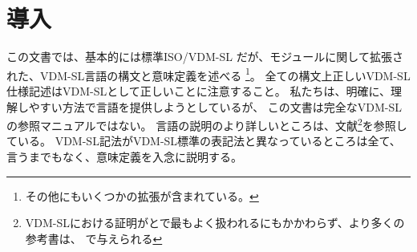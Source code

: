 \documentclass[\pformat,12pt]{jarticle}
\newcommand{\vdmsl}{VDM-SL}
\begin{document}




\newcommand{\Lit}[1]{`{\tt #1}\Quote}
\newcommand{\Rule}[2]{
  \begin{quote}\begin{tabbing}
    #1\index{#1}\ \ \= = \ \ \= #2  ; %
    
  \end{tabbing}\end{quote}
  }
\newcommand{\SeqPt}[1]{\{\ #1\ \}}
\newcommand{\lfeed}{\\ \> \>}
\newcommand{\dsepl}{\ $|$\ }
\newcommand{\dsep}{\\ \> $|$ \>}
\newcommand{\Lop}[1]{`{\sf #1}\Quote}
\newcommand{\blankline}{\vspace{\baselineskip}}
\newcommand{\Brack}[1]{(\ #1\ )}
\newcommand{\nmk}{\footnotemark}
\newcommand{\ntext}[1]{\footnotetext{{\bf Note: } #1}}
\newlength{\kwlen}
\newcommand{\Keyw}[1]{\settowidth{\kwlen}{\tt #1}\makebox[\kwlen][l]{\sf
    #1}}
\newcommand{\keyw}[1]{{\sf #1}}
\newcommand{\id}[1]{{\tt #1}}
\newcommand{\metaiv}[1]{\begin{alltt}\end{alltt}}

\newcommand{\OptPt}[1]{[\ #1\ ]}
\newcommand{\MAP}[2]{\kw{map }#1\kw{ to }#2}
\newcommand{\INMAP}[2]{\kw{inmap }#1\kw{ to }#2}
\newcommand{\SEQ}[1]{\kw{seq of }#1}
\newcommand{\NSEQ}[1]{\kw{seq1 of }#1}
\newcommand{\SET}[1]{\kw{set of }#1}
\newcommand{\PROD}[2]{#1 * #2}
\newcommand{\TO}[2]{$#1 \To #2$}
\newcommand{\FUN}[2]{#1 \To #2}
\newcommand{\PUBLIC}{\ifthenelse{\boolean{VDMpp}}{public\mbox{}}{\mbox{}}}
\newcommand{\PRIVATE}{\ifthenelse{\boolean{VDMpp}}{private}{\mbox{}}}
\newcommand{\PROTECTED}{\ifthenelse{\boolean{VDMpp}}{protected}{\mbox{}}}




\section{導入}


この文書では、基本的には標準ISO/VDM-SL \cite{ISOVDM96}だが、モジュールに関して拡張された、VDM-SL言語の構文と意味定義を述べる
\footnote{その他にもいくつかの拡張が含まれている。}。
全ての構文上正しい{\vdmsl}仕様記述は{\vdmsl}として正しいことに注意すること。
私たちは、明確に、理解しやすい方法で言語を提供しようとしているが、
この文書は完全な{\vdmsl}の参照マニュアルではない。
言語の説明のより詳しいところは、文献\footnote{VDM-SLにおける証明が\cite{Jones90a}と\cite{Bicarregui&94}で最もよく扱われるにもかかわらず、より多くの参考書は、
\cite{Fitzgerald&98}で与えられる}を参照している。
VDM-SL記法がVDM-SL標準の表記法と異なっているところは全て、言うまでもなく、意味定義を入念に説明する。
\end{document}
